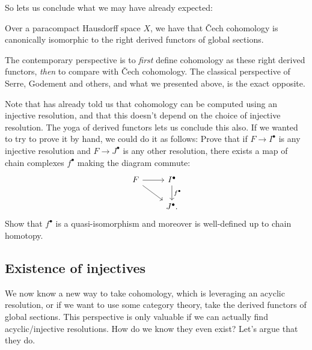 \documentclass[11pt]{book}
\begin{document}
So  lets us conclude what we may have already expected:

\begin{corollary}\label{cor:cech-equals-sheaf-cohomology-paracompact-Hausdorff} 
Over a paracompact Hausdorff space $X$, we have that \v{C}ech cohomology is canonically isomorphic to the right derived functors of global sections.
\end{corollary}

\begin{remark} The contemporary perspective is to \emph{first} define cohomology as these right derived functors, \emph{then} to compare with \v{C}ech cohomology. The classical perspective of Serre, Godement and others, and what we presented above, is the exact opposite.
\end{remark}

\begin{exercise} Note that  has already told us that cohomology can be computed using an injective resolution, and that this doesn't depend on the choice of injective resolution. The yoga of derived functors lets us conclude this also. If we wanted to try to prove it by hand, we could do it as follows: Prove that if $F \to I^\bullet$ is any injective resolution and $F \to J^\bullet$ is any other resolution, there exists a map of chain complexes $f^\bullet$ making the diagram commute:
\[ \begin{tikzcd}
    F\rar\ar[dr] & I^\bullet\dar["f^\bullet" right]\\
     & J^\bullet.
\end{tikzcd}\]
Show that $f^\bullet$ is a quasi-isomorphism and moreover is well-defined up to chain homotopy.
\end{exercise}

\subsection{Existence of injectives}

We now know a new way to take cohomology, which is leveraging an acyclic resolution, or if we want to use some category theory, take the derived functors of global sections. This perspective is only valuable if we can actually find acyclic/injective resolutions. How do we know they even exist? Let's argue that they do.
\end{document}
